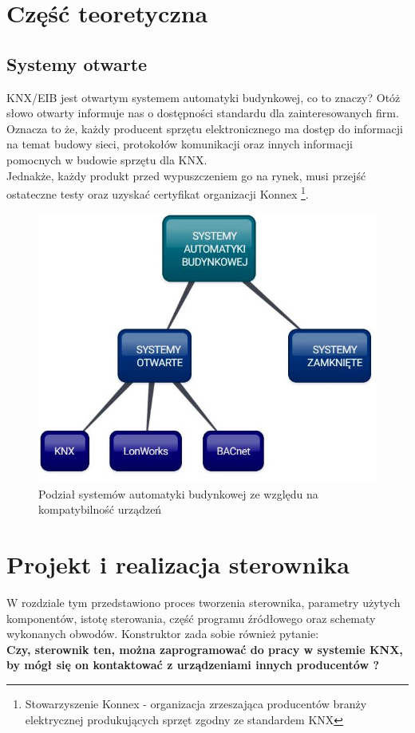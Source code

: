 \documentclass[a4paper, 11pt]{report}
\newcommand{\ods}{\hspace*{1em}}
\begin{document}
\newpage
\chapter{Część teoretyczna}
\section{Systemy otwarte}
\ods KNX/EIB jest otwartym systemem automatyki budynkowej, co to znaczy? Otóż słowo otwarty informuje nas o dostępności standardu dla zainteresowanych firm. Oznacza to że, każdy producent sprzętu elektronicznego ma dostęp do informacji na temat budowy sieci, protokołów komunikacji oraz innych informacji pomocnych w budowie sprzętu dla KNX. \\Jednakże, każdy produkt przed wypuszczeniem go na rynek, musi przejść ostateczne testy oraz uzyskać certyfikat organizacji Konnex \footnote{Stowarzyszenie Konnex - organizacja zrzeszająca producentów branży elektrycznej produkujących sprzęt zgodny ze standardem KNX}.

\newpage
\begin{figure}[h]
	\centering
	\includegraphics[scale=0.5]{files/systemy}
	\caption[Podział systemów]{Podział systemów automatyki budynkowej ze względu na kompatybilność urządzeń}
\end{figure}

\newpage
\chapter{Projekt i realizacja sterownika}
\ods W rozdziale tym przedstawiono proces tworzenia sterownika, parametry użytych komponentów, istotę sterowania, część programu źródłowego oraz schematy wykonanych obwodów. Konstruktor zada sobie również pytanie:\\
\textbf{Czy, sterownik ten, można zaprogramować do pracy w systemie KNX, by mógł się on kontaktować z urządzeniami innych producentów ?}
\end{document}
